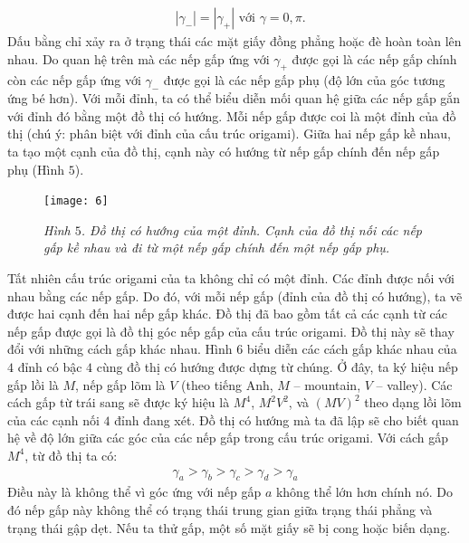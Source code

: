 \begin{multicols}{2}
\begin{align*}
		&|\gamma_-| = |\gamma_+| \text{ với } \gamma = 0,\pi.
	\end{align*}
	Dấu bằng chỉ xảy ra ở trạng thái các mặt giấy đồng phẳng hoặc đè hoàn toàn lên nhau. Do quan hệ trên mà các nếp gấp ứng với $\gamma_+$ được gọi là các nếp gấp chính còn các nếp gấp ứng với $\gamma_-$ được gọi là các nếp gấp phụ (độ lớn của góc tương ứng bé hơn).
	\vskip 0.05cm
	Với mỗi đỉnh, ta có thể biểu diễn mối quan hệ giữa các nếp gấp gắn với đỉnh đó bằng một đồ thị có hướng. Mỗi nếp gấp được coi là một đỉnh của đồ thị (chú ý: phân biệt với đỉnh của cấu trúc origami). Giữa hai nếp gấp kề nhau, ta tạo một cạnh của đồ thị, cạnh này có hướng từ nếp gấp chính đến nếp gấp phụ (Hình $5$).
		\begin{figure}[H]
		\vspace*{-5pt}
		\centering
		\captionsetup{labelformat= empty, justification=centering}
		\texttt{[image: 6]}
		\caption{\small\textit{\color{duongvaotoanhoc}Hình $5$. Đồ thị có hướng của một đỉnh. Cạnh của đồ thị nối các nếp gấp kề nhau và đi từ một nếp gấp chính đến một nếp gấp phụ.}}
		\vspace*{-10pt}
	\end{figure}
	Tất nhiên cấu trúc origami của ta không chỉ có một đỉnh. Các đỉnh được nối với nhau bằng các nếp gấp. Do đó, với mỗi nếp gấp \linebreak(đỉnh của đồ thị có hướng), ta vẽ được hai \linebreak cạnh đến hai nếp gấp khác. Đồ thị đã bao gồm tất cả các cạnh từ các nếp gấp được gọi là đồ thị góc nếp gấp của cấu trúc origami. Đồ thị này sẽ thay đổi với những cách gấp khác nhau. Hình $6$ biểu diễn các cách gấp khác nhau của $4$ đỉnh có bậc $4$ cùng đồ thị có hướng được dựng từ chúng. Ở đây, ta ký hiệu nếp gấp lồi là $M$, nếp gấp lõm là $V$ (theo tiếng Anh, $M$ -- mountain, $V$ -- valley). Các cách gấp từ trái sang sẽ được ký hiệu là $M^4$, $M^2 V^2$, và $(MV)^2$ theo dạng lồi lõm của các cạnh nối $4$ đỉnh đang xét.
	\vskip 0.05cm
	Đồ thị có hướng mà ta đã lập sẽ cho biết quan hệ về độ lớn giữa các góc của các nếp gấp trong cấu trúc origami. Với cách gấp $M^4$, từ đồ thị ta có:
	\begin{align*}
		\gamma_a > \gamma_b > \gamma_c > \gamma_d > \gamma_a
	\end{align*}
	Điều này là không thể vì góc ứng với nếp gấp $a$ không thể lớn hơn chính nó. Do đó nếp gấp này không thể có trạng thái trung gian giữa trạng thái phẳng và trạng thái gập dẹt. Nếu ta thử gấp, một số mặt giấy sẽ bị cong hoặc biến dạng.
	\begin{figure}[H]

\end{figure}
\end{multicols}
